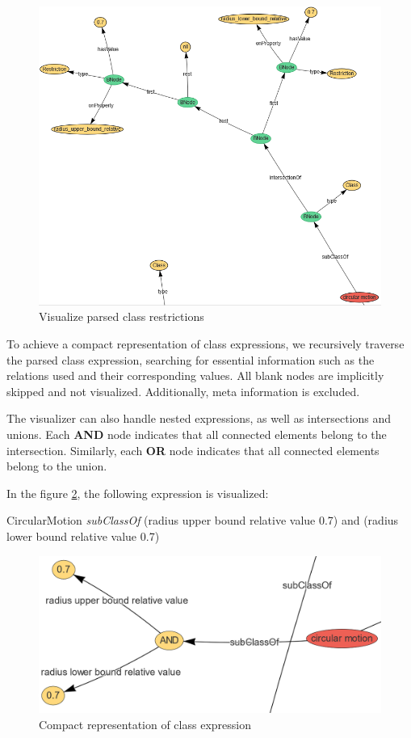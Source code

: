 \begin{figure}[H]
    \includegraphics[scale=0.5]{Graphics/OwlVisualizer/graphProcessing2.png}
    \centering
    \caption{Visualize parsed class restrictions}
    \label{fig:graphProcessing2}
\end{figure}

To achieve a compact representation of class expressions, we recursively traverse the parsed class expression, 
searching for essential information such as the relations used and their corresponding values. 
All blank nodes are implicitly skipped and not visualized. Additionally, meta information is excluded.

The visualizer can also handle nested expressions, as well as intersections and unions. Each \textbf{AND} node indicates that all connected elements belong to the intersection.
Similarly, each \textbf{OR} node indicates that all connected elements belong to the union.

In the figure \ref{fig:graphProcessing3}, the following expression is visualized:

CircularMotion \textit{subClassOf} (radius upper bound relative value 0.7) and (radius lower bound relative value 0.7)

\begin{figure}[H]
    \includegraphics[scale=0.3]{Graphics/OwlVisualizer/graphProcessing3.png}
    \centering
    \caption{Compact representation of class expression}
    \label{fig:graphProcessing3}
\end{figure}

